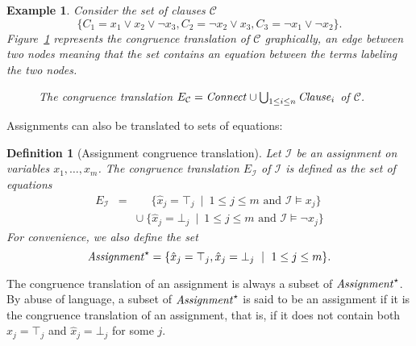 \documentclass{easychair}
\newtheorem{example}{Example}
\newtheorem{definition}{Definition}
\begin{document}
\begin{example}\label{ex:np1}
Consider the set of clauses $\mathcal{C}$
\begin{equation*}
\big\{C_1 = x_1 \vee x_2 \vee \neg x_3, C_2 = \neg x_2 \vee x_3, C_3 = \neg x_1 \vee \neg x_2\big\}.
\end{equation*}
Figure~\ref{fig:npexamplebig} represents the congruence translation of
$\mathcal{C}$ graphically, an edge between two nodes meaning that the set
contains an equation between the terms labeling the two nodes.

\begin{figure}[htb]

\caption{The congruence translation $E_{\mathcal{C}} = {\it Connect} \cup \bigcup_{1 \leq i \leq n}{\it Clause}_i$ of $\mathcal{C}$.}
\label{fig:npexamplebig}
\end{figure}

\end{example}

Assignments can also be translated to sets of equations:
\begin{definition}[Assignment congruence translation]
Let $\mathcal{I}$ be an assignment on variables $x_1,\ldots,x_m$.
The congruence translation $E_{\mathcal{I}}$ of $\mathcal{I}$ is defined as the set of equations
\begin{eqnarray*}
  E_{\mathcal{I}} & = & \phantom{\cup}\ \{ \hat{x}_j = \top_j \ \mid\  1 \leq j \leq m \text{ and } \mathcal{I} \models x_j \} \\
               &   & \cup\ \{ \hat{x}_j = \bot_j \ \mid\ 1 \leq j \leq m \text{ and } \mathcal{I} \models \neg x_j \}
\end{eqnarray*}
For convenience, we also define the set
\begin{equation*}
  {\it Assignment}^\star = \{ \hat{x}_j = \top_j, \hat{x}_j = \bot_j \ \mid\ 1 \leq j \leq m\}.
\end{equation*}
\end{definition}
\noindent
The congruence translation of an assignment is always a subset of
${\it Assignment}^\star$.  By abuse of language, a subset of ${\it Assignment}^\star$ is
said to be an assignment if it is the congruence translation of an assignment,
that is, if it does not contain both $\hat{x}_j = \top_j$ and $\hat{x}_j =
\bot_j$ for some $j$.
\end{document}
